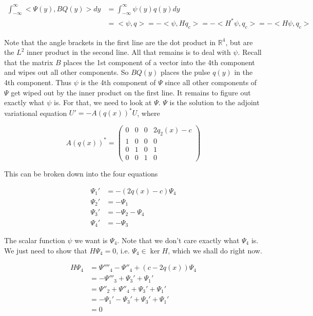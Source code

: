 \documentclass[12pt]{article}
\def\R{{\mathbb R}}
\begin{document}
\begin{align*}
 \int_{-\infty}^\infty <\Psi(y), BQ(y)> dy &=  \int_{-\infty}^\infty \psi(y) q(y) dy \\
&= <\psi, q> = -<\psi, H q_c> = -<H^* \psi, q_c> = -<H \psi, q_c> 
\end{align*}

Note that the angle brackets in the first line are the dot product in $\R^4$, but are the $L^2$ inner product in the second line. All that remains is to deal with $\psi$. Recall that the matrix $B$ places the 1st component of a vector into the 4th component and wipes out all other components. So $BQ(y)$ places the pulse $q(y)$ in the 4th component. Thus $\psi$ is the 4th component of $\Psi$ since all other components of $\Psi$ get wiped out by the inner product on the first line. It remains to figure out exactly what $\psi$ is. For that, we need to look at $\Psi$. $\Psi$ is the solution to the adjoint variational equation $U' = -A(q(x))^*U$, where 

\[ 
A(q(x))^* = 
 \begin{pmatrix}0 & 0 & 0 & 2q_2(x) - c \\ 1 & 0 & 0 & 0 \\ 0 & 1 & 0 & 1 \\ 0 & 0 & 1 & 0\end{pmatrix}
\]

This can be broken down into the four equations

\begin{align*}
\Psi_1' &= -(2q(x) - c) \Psi_4 \\
\Psi_2' &= -\Psi_1 \\
\Psi_3' &= -\Psi_2 - \Psi_4 \\
\Psi_4' &= -\Psi_3
\end{align*}

The scalar function $\psi$ we want is $\Psi_4$. Note that we don't care exactly what $\Psi_4$ is. We just need to show that $H \Psi_4 = 0$, i.e. $\Psi_4 \in \ker H$, which we shall do right now.

\begin{align*}
H \Psi_4 &= \Psi''''_4 - \Psi''_4 + (c - 2q(x))\Psi_4 \\
&= -\Psi'''_3 + \Psi_3' + \Psi_1' \\
&= \Psi''_2 + \Psi''_4 + \Psi_3' + \Psi_1' \\
&= -\Psi_1' - \Psi_3' + \Psi_3' + \Psi_1'\\
&= 0
\end{align*}
\end{document}
